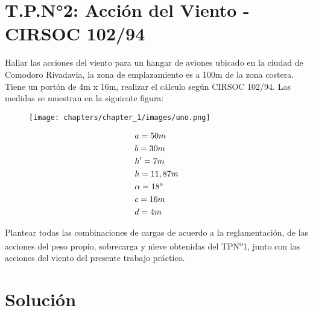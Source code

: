 \section{T.P.N°2: Acción del Viento - CIRSOC 102/94}
 
Hallar las acciones del viento para un hangar de aviones ubicado en la ciudad de Comodoro Rivadavia, la zona de emplazamiento es a 100m de la zona costera. Tiene un portón de 4m x 16m, realizar el cálculo según CIRSOC 102/94. Las medidas se muestran en la siguiente figura:\\

\begin{figure}[H]
\begin{center}
     \texttt{[image: chapters/chapter\_1/images/uno.png]}
\end{center}
\end{figure}

\begin{align*}
& a=50m \\
& b=30m \\
& h'=7m \\
& h=11,87m \\
& \alpha=18\textsuperscript{o} \\
& c=16m \\
& d=4m
\end{align*}

Plantear todas las combinaciones de cargas de acuerdo a la reglamentación, de las acciones del peso propio, sobrecarga y nieve obtenidas del TPN\textsuperscript{o}1, junto con las acciones del viento del presente trabajo práctico.

\newpage

\section{Solución}

